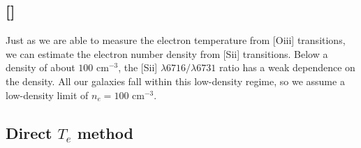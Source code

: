 \subsection{[]}

Just as we are able to measure the electron temperature from [O{\sc iii}] 
transitions, we can estimate the electron number density from [S{\sc ii}] 
transitions.  Below a density of about $100 \text{ cm}^{-3}$, the [S{\sc ii}] 
$\lambda 6716 / \lambda 6731$ ratio has a weak dependence on the density.  All 
our galaxies fall within this low-density regime, so we assume a low-density 
limit of $n_e = 100 \text{ cm}^{-3}$.

%


\subsection{Direct $T_e$ method}


